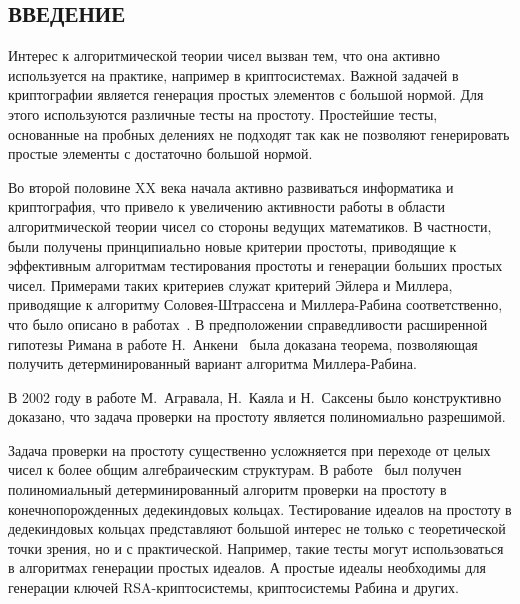 \documentclass[_00_dissertation.tex]{subfiles}
\begin{document}
\onlyinsubfile{
    \renewcommand{\contentsname}{ОГЛАВЛЕНИЕ}
    \setcounter{tocdepth}{3}
    \tableofcontents
}

\begin{center}
    \chapter*{ВВЕДЕНИЕ}
\end{center}

Интерес к алгоритмической теории чисел вызван тем, что она активно используется на практике, например в криптосистемах.
Важной задачей в криптографии является генерация простых элементов с большой нормой.
Для этого используются различные тесты на простоту.
Простейшие тесты, основанные на пробных делениях не подходят так как не позволяют генерировать простые элементы с достаточно большой нормой.

Во второй половине XX века начала активно развиваться информатика и криптография, что привело к увеличению активности работы в области алгоритмической теории чисел со стороны ведущих математиков.
В частности, были получены принципиально новые критерии простоты, приводящие к эффективным алгоритмам тестирования простоты и генерации больших простых чисел.
Примерами таких критериев служат критерий Эйлера и Миллера, приводящие к алгоритму Соловея-Штрассена и Миллера-Рабина соответственно, что было описано в работах~\cite{source:Miller, source:Rabin, source:Solovay}.
В предположении справедливости расширенной гипотезы Римана в работе Н.~Анкени~\cite{source:Ankeny} была доказана теорема, позволяющая получить детерминированный вариант алгоритма Миллера-Рабина.

В 2002 году в работе М.~Агравала, Н.~Каяла и Н.~Саксены \cite{source:AKS} было конструктивно доказано, что задача проверки на простоту является полиномиально разрешимой.

Задача проверки на простоту существенно усложняется при переходе от целых чисел к более общим алгебраическим структурам.
В работе~\cite{source:Huang_Prime_in_P} был получен полиномиальный детерминированный алгоритм проверки на простоту в конечнопорожденных дедекиндовых кольцах.
Тестирование идеалов на простоту в дедекиндовых кольцах представляют большой интерес не только с теоретической точки зрения, но и с практической.
Например, такие тесты могут использоваться в алгоритмах генерации простых идеалов.
А простые идеалы необходимы для генерации ключей RSA-криптосистемы, криптосистемы Рабина и других.
\end{document}
